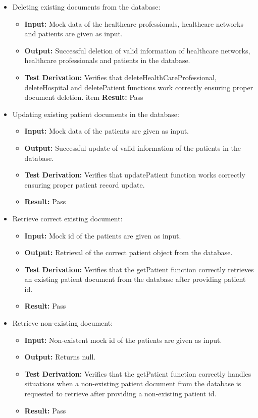 \documentclass[12pt, titlepage]{article}
\begin{document}
\begin{itemize}
    \item Deleting existing documents from the database:
      \begin{itemize}
        \item \textbf{Input:} Mock data of the healthcare professionals, healthcare networks and patients are given as input.  
        \item \textbf{Output:} Successful deletion of valid information of healthcare networks, healthcare professionals and patients in the database. 
        \item \textbf{Test Derivation:} Verifies that deleteHealthCareProfessional, deleteHospital and deletePatient functions work correctly ensuring proper document deletion.
        item \textbf{Result:} Pass
      \end{itemize}

    \item Updating existing patient documents in the database:
      \begin{itemize}
        \item \textbf{Input:} Mock data of the patients are given as input.  
        \item \textbf{Output:} Successful update of valid information of the patients in the database. 
        \item \textbf{Test Derivation:} Verifies that updatePatient function works correctly ensuring proper patient record update.
        \item \textbf{Result:} Pass
      \end{itemize}

    \item Retrieve correct existing document:
      \begin{itemize}
        \item \textbf{Input:} Mock id of the patients are given as input.  
        \item \textbf{Output:} Retrieval of the correct patient object from the database. 
        \item \textbf{Test Derivation:} Verifies that the getPatient function correctly retrieves an existing patient document from the database after providing patient id.
        \item \textbf{Result:} Pass
      \end{itemize}

    \item Retrieve non-existing document:
      \begin{itemize}
        \item \textbf{Input:} Non-existent mock id of the patients are given as input.  
        \item \textbf{Output:} Returns null. 
        \item \textbf{Test Derivation:} Verifies that the getPatient function correctly handles situations when a non-existing patient document from the database is requested to retrieve after providing a non-existing patient id.
        \item \textbf{Result:} Pass
      \end{itemize}
  \end{itemize}
\end{document}
